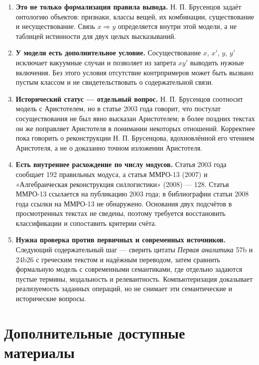 \documentclass[12pt,a4paper]{article}
\begin{document}
\begin{enumerate}
\item \textbf{Это не только формализация правила вывода.} Н. П. Брусенцов задаёт онтологию объектов: признаки, классы вещей, их комбинации, существование и несуществование. Связь \(x\Rightarrow y\) определяется внутри этой модели, а не таблицей истинности для двух целых высказываний.
\item \textbf{У модели есть дополнительное условие.} Сосуществование \(x\), \(x'\), \(y\), \(y'\) исключает вакуумные случаи и позволяет из запрета \(xy'\) выводить нужные включения. Без этого условия отсутствие контрпримеров может быть вызвано пустым классом и не свидетельствовать о содержательной связи.
\item \textbf{Исторический статус — отдельный вопрос.} Н. П. Брусенцов соотносит модель с Аристотелем, но в статье 2003 года говорит, что постулат сосуществования не был явно высказан Аристотелем; в более поздних текстах он же поправляет Аристотеля в понимании некоторых отношений. Корректнее пока говорить о реконструкции Н. П. Брусенцова, вдохновлённой его чтением Аристотеля, а не о доказанно точном изложении Аристотеля.
\item \textbf{Есть внутреннее расхождение по числу модусов.} Статья 2003 года сообщает 192 правильных модуса, а статья ММРО-13 (2007) и «Алгебраическая реконструкция силлогистики» (2008) — 128. Статья ММРО-13 ссылается на публикацию 2003 года; в библиографии статьи 2008 года ссылки на ММРО-13 не обнаружено. Основания двух подсчётов в просмотренных текстах не сведены, поэтому требуется восстановить классификации и сопоставить критерии счёта.
\item \textbf{Нужна проверка против первичных и современных источников.} Следующий содержательный шаг — сверить цитаты \emph{Первая аналитика} 57b и 24b26 с греческим текстом и надёжным переводом, затем сравнить формальную модель с современными семантиками, где отдельно задаются пустые термины, модальность и релевантность. Компьютеризация доказывает реализуемость заданных операций, но не снимает эти семантические и исторические вопросы.
\end{enumerate}
\section{Дополнительные доступные материалы}
\end{document}
